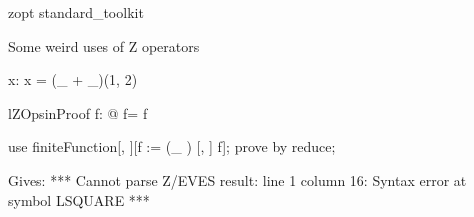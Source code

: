 \begin{zsection}
   \SECTION zopt \parents standard\_toolkit
\end{zsection}

Some weird uses of Z operators

\begin{axdef}
   x: \nat
\where
   x = (\_ + \_)(1, 2)
\end{axdef}

\begin{theorem}{lZOpsinProof}
   \forall f: \nat \fun \nat @ f\inv = f
\end{theorem}

\begin{zproof}[lZOpsinProof]
  use finiteFunction[\nat, \nat][f := (\_ \inv) [\nat, \nat] f];
  prove by reduce;
\end{zproof}

Gives:
***
Cannot parse Z/EVES result:
line 1 column 16: Syntax error at symbol LSQUARE
***